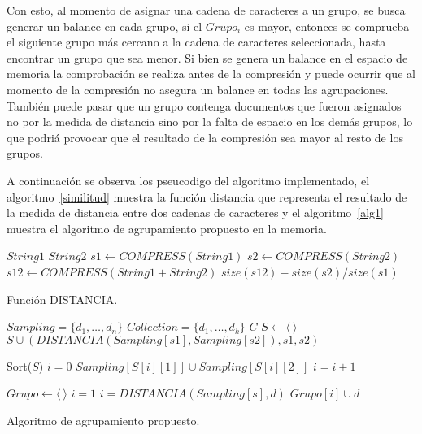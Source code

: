 \begin{enumerate}
Con esto, al momento de asignar una cadena de caracteres a un grupo, se busca generar un balance en cada grupo, si el $Grupo_{i}$ es mayor, entonces se comprueba el siguiente grupo más cercano a la cadena de caracteres seleccionada, hasta encontrar un grupo que sea menor. Si bien se genera un balance en el espacio de memoria la comprobación se realiza antes de la compresión y puede ocurrir que al momento de la compresión no asegura un balance en todas las agrupaciones. También puede pasar que un grupo contenga documentos que fueron asignados no por la medida de distancia sino por la falta de espacio en los demás grupos, lo que podriá provocar que el resultado de la compresión sea mayor al resto de los grupos.

\end{enumerate}


A continuación se observa los pseucodigo del algoritmo implementado, el algoritmo~\ref{similitud} muestra la función distancia que representa el resultado de la medida de distancia entre dos cadenas de caracteres y el algoritmo~\ref{alg1} muestra el algoritmo de agrupamiento propuesto en la memoria.

\begin{algorithm}[ht!]
\begin{algorithmic}[1]
\REQUIRE $String1$
\REQUIRE $String2$
\STATE $s1 \leftarrow COMPRESS(String1)$
\STATE $s2 \leftarrow COMPRESS(String2)$
\STATE $s12 \leftarrow COMPRESS(String1+ String2)$
\RETURN $size(s12)-size(s2)/size(s1)$

\end{algorithmic}
\caption{Función DISTANCIA.}\label{similitud}
\end{algorithm}



\begin{algorithm}[ht!]
\begin{algorithmic}[1]
\REQUIRE $Sampling=\{d_{1}, \dots, d_{n} \}$
\REQUIRE $Collection=\{d_{1}, \dots, d_{k} \}$ 
\REQUIRE $C$ 
\STATE $S \leftarrow \langle\ \rangle$
			\STATE $S \cup  (DISTANCIA(Sampling[s1],Sampling[s2]) , s1 ,s2)$
		\ENDFOR
\ENDFOR

\STATE Sort($S$)
\STATE $i = 0$
	\STATE $ Sampling[S[i][1]] \cup Sampling[S[i][2]]$
	\STATE $i = i +1$
\ENDWHILE

\STATE $Grupo \leftarrow \langle\ \rangle$  
\STATE $i = 1$
		\STATE $i = DISTANCIA(Sampling[s],d)$
	\ENDIF
\ENDFOR
\STATE $Grupo[i] \cup d$
\ENDFOR

\end{algorithmic}
\caption{Algoritmo de agrupamiento propuesto.}\label{alg1} 
\end{algorithm}


